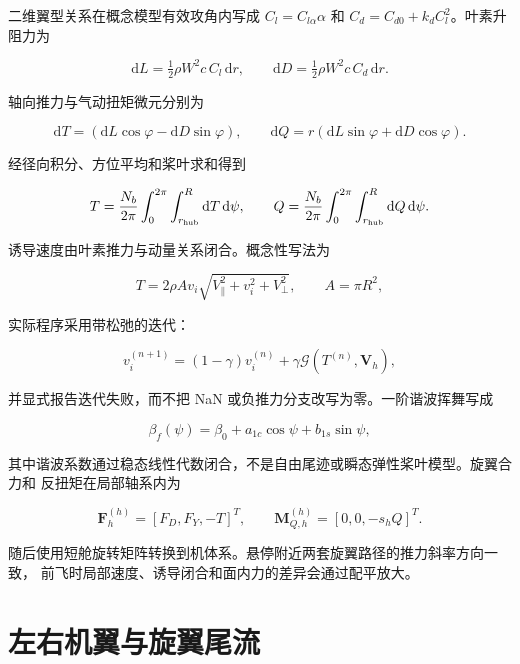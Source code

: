 \documentclass[UTF8,12pt,oneside,openany,fontset=windows]{ctexbook}
\begin{document}
二维翼型关系在概念模型有效攻角内写成 \(C_l=C_{l\alpha}\alpha\) 和 \(C_d=C_{d0}+k_dC_l^2\)。叶素升阻力为

\begin{equation}
\mathrm dL=\tfrac12\rho W^2c\,C_l\,\mathrm dr,\qquad
\mathrm dD=\tfrac12\rho W^2c\,C_d\,\mathrm dr.
\end{equation}

轴向推力与气动扭矩微元分别为

\begin{equation}
\mathrm dT=(\mathrm dL\cos\varphi-\mathrm dD\sin\varphi),\qquad
\mathrm dQ=r(\mathrm dL\sin\varphi+\mathrm dD\cos\varphi).
\end{equation}

经径向积分、方位平均和桨叶求和得到

\begin{equation}
T=\frac{N_b}{2\pi}\int_0^{2\pi}\int_{r_{\rm hub}}^R\mathrm dT\,\mathrm d\psi,
\qquad
Q=\frac{N_b}{2\pi}\int_0^{2\pi}\int_{r_{\rm hub}}^R\mathrm dQ\,\mathrm d\psi .
\end{equation}

诱导速度由叶素推力与动量关系闭合。概念性写法为

\begin{equation}
T=2\rho A v_i\sqrt{V_\parallel^2+v_i^2+V_\perp^2},
\qquad A=\pi R^2,
\end{equation}

实际程序采用带松弛的迭代：

\begin{equation}
v_i^{(n+1)}=(1-\gamma)v_i^{(n)}+\gamma\mathcal G(T^{(n)},\mathbf V_h),
\end{equation}

并显式报告迭代失败，而不把 NaN 或负推力分支改写为零。一阶谐波挥舞写成

\begin{equation}
\beta_f(\psi)=\beta_0+a_{1c}\cos\psi+b_{1s}\sin\psi,
\end{equation}

其中谐波系数通过稳态线性代数闭合，不是自由尾迹或瞬态弹性桨叶模型。旋翼合力和 反扭矩在局部轴系内为

\begin{equation}
\mathbf F_h^{(h)}=[F_D,F_Y,-T]^T,\qquad
\mathbf M_{Q,h}^{(h)}=[0,0,-s_hQ]^T.
\end{equation}

随后使用短舱旋转矩阵转换到机体系。悬停附近两套旋翼路径的推力斜率方向一致， 前飞时局部速度、诱导闭合和面内力的差异会通过配平放大。

\section{左右机翼与旋翼尾流}
\end{document}

